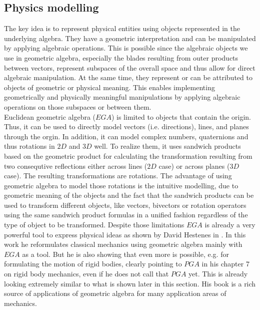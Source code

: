 \subsection{Physics modelling}
\label{subsection_physics_modelling}

The key idea is to represent physical entities using objects represented in the underlying
algebra. They have a geometric interpretation and can be manipulated by applying algebraic
operations. This is possible since the algebraic objects we use in geometric algebra,
especially the blades resulting from outer products between vectors, represent subspaces
of the overall space and thus allow for direct algebraic manipulation. At the same time,
they represent or can be attributed to objects of geometric or physical meaning. This
enables implementing geometrically and physically meaningful manipulations by applying
algebraic operations on those subspaces or between them. \\

Euclidean geometric algebra ($EGA$) is limited to objects that contain the origin. Thus,
it can be used to directly model vectors (i.e. directions), lines, and planes through the
orgin. In addition, it can model complex numbers, quaternions and thus rotations in $2D$
and $3D$ well. To realize them, it uses sandwich products based on the geometric product
for calculating the transformation resulting from two consequtive reflections either
across lines ($2D$ case) or across planes ($3D$ case). The resulting transformations are
rotations. The advantage of using geometric algebra to model those rotations is the
intuitive modelling, due to geometric meaning of the objects and the fact that the
sandwich products can be used to transform different objects, like vectors, bivectors or
rotation operators using the same sandwich product formulas in a unified fashion
regardless of the type of object to be transformed. Despite those limitations $EGA$ is
already a very powerful tool to express physical ideas as shown by David Hestenes in
\cite{David_Hestenes_NFCM:1986}. In this work he reformulates classical mechanics using
geometric algebra mainly with $EGA$ as a tool. But he is also showing that even more is
possible, e.g. for formulating the motion of rigid bodies, clearly pointing to $PGA$ in
his chapter 7 on rigid body mechanics, even if he does not call that $PGA$ yet. This is
already looking extremely similar to what is shown later in this section. His book is a
rich source of applications of geometric algebra for many application areas of
mechanics.\\

